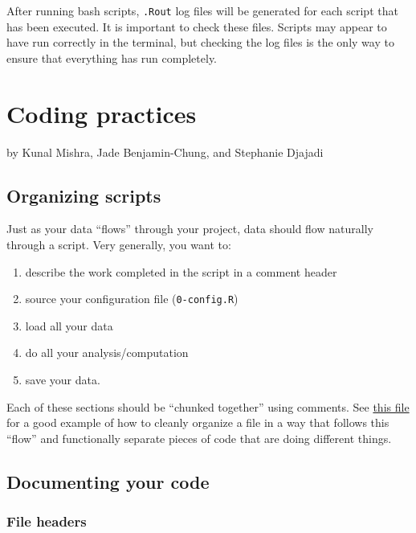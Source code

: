 \documentclass[
]{book}
\providecommand{\tightlist}{%
  \setlength{\itemsep}{0pt}\setlength{\parskip}{0pt}}
\begin{document}
After running bash scripts, \texttt{.Rout} log files will be generated for each script that has been executed. It is important to check these files. Scripts may appear to have run correctly in the terminal, but checking the log files is the only way to ensure that everything has run completely.

\hypertarget{coding-practices}{%
\chapter{Coding practices}\label{coding-practices}}

by Kunal Mishra, Jade Benjamin-Chung, and Stephanie Djajadi

\hypertarget{organizing-scripts}{%
\section{Organizing scripts}\label{organizing-scripts}}

Just as your data ``flows'' through your project, data should flow naturally through a script. Very generally, you want to:

\begin{enumerate}
\def\labelenumi{\arabic{enumi}.}
\tightlist
\item
  describe the work completed in the script in a comment header
\item
  source your configuration file (\texttt{0-config.R})
\item
  load all your data
\item
  do all your analysis/computation
\item
  save your data.
\end{enumerate}

Each of these sections should be ``chunked together'' using comments. See \href{https://github.com/kmishra9/Flu-Absenteeism/blob/master/Master's\%20Thesis\%20-\%20Spatial\%20Epidemiology\%20of\%20Influenza/2a\%20-\%20Statistical-Inputs.R}{this file} for a good example of how to cleanly organize a file in a way that follows this ``flow'' and functionally separate pieces of code that are doing different things.

\hypertarget{documenting-your-code}{%
\section{Documenting your code}\label{documenting-your-code}}

\hypertarget{file-headers}{%
\subsection{File headers}\label{file-headers}}
\end{document}
